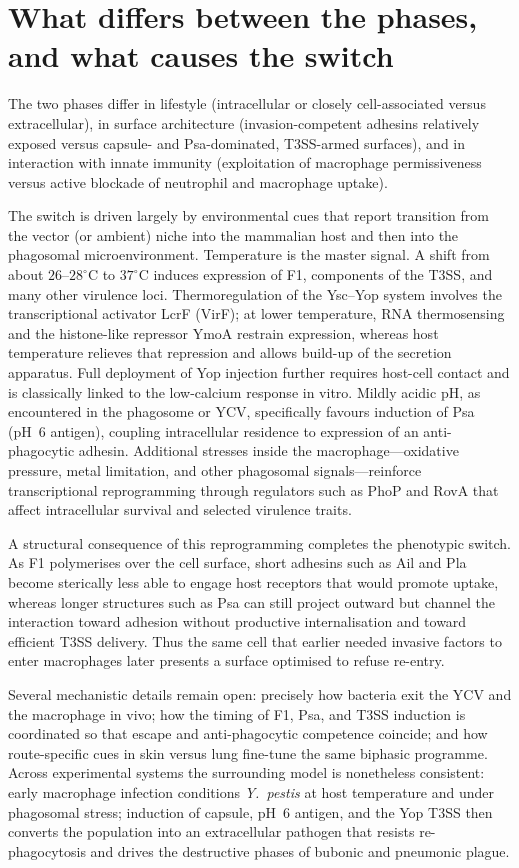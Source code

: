 \documentclass[11pt,a4paper]{article}
\begin{document}
\section{What differs between the phases, and what causes the switch}

The two phases differ in lifestyle (intracellular or closely cell-associated versus extracellular), in surface architecture (invasion-competent adhesins relatively exposed versus capsule- and Psa-dominated, T3SS-armed surfaces), and in interaction with innate immunity (exploitation of macrophage permissiveness versus active blockade of neutrophil and macrophage uptake).

The switch is driven largely by environmental cues that report transition from the vector (or ambient) niche into the mammalian host and then into the phagosomal microenvironment. Temperature is the master signal. A shift from about $26$--$28^\circ\mathrm{C}$ to $37^\circ\mathrm{C}$ induces expression of F1, components of the T3SS, and many other virulence loci. Thermoregulation of the Ysc--Yop system involves the transcriptional activator LcrF (VirF); at lower temperature, RNA thermosensing and the histone-like repressor YmoA restrain expression, whereas host temperature relieves that repression and allows build-up of the secretion apparatus. Full deployment of Yop injection further requires host-cell contact and is classically linked to the low-calcium response in vitro. Mildly acidic pH, as encountered in the phagosome or YCV, specifically favours induction of Psa (pH~6 antigen), coupling intracellular residence to expression of an anti-phagocytic adhesin. Additional stresses inside the macrophage---oxidative pressure, metal limitation, and other phagosomal signals---reinforce transcriptional reprogramming through regulators such as PhoP and RovA that affect intracellular survival and selected virulence traits.

A structural consequence of this reprogramming completes the phenotypic switch. As F1 polymerises over the cell surface, short adhesins such as Ail and Pla become sterically less able to engage host receptors that would promote uptake, whereas longer structures such as Psa can still project outward but channel the interaction toward adhesion without productive internalisation and toward efficient T3SS delivery. Thus the same cell that earlier needed invasive factors to enter macrophages later presents a surface optimised to refuse re-entry.

Several mechanistic details remain open: precisely how bacteria exit the YCV and the macrophage in vivo; how the timing of F1, Psa, and T3SS induction is coordinated so that escape and anti-phagocytic competence coincide; and how route-specific cues in skin versus lung fine-tune the same biphasic programme. Across experimental systems the surrounding model is nonetheless consistent: early macrophage infection conditions \textit{Y.\ pestis} at host temperature and under phagosomal stress; induction of capsule, pH~6 antigen, and the Yop T3SS then converts the population into an extracellular pathogen that resists re-phagocytosis and drives the destructive phases of bubonic and pneumonic plague.
\end{document}
